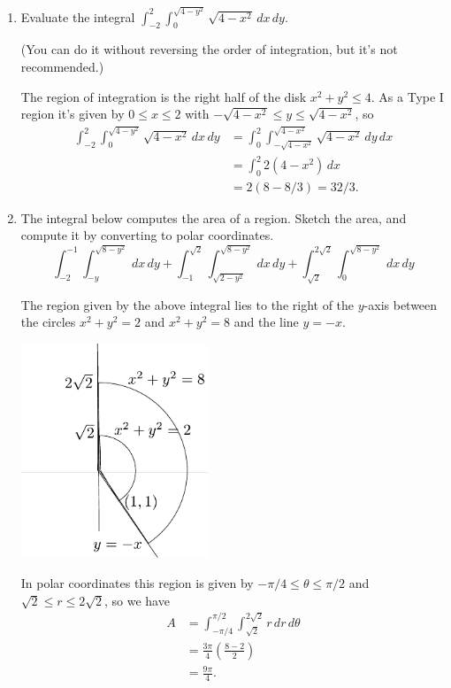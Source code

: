 \documentclass[12pt]{article}
\newcommand{\points}[1]{\marginpar{\hspace{24pt}[#1]}}
\newcommand{\di}{\displaystyle}
\begin{document}
\begin{enumerate}
\item Evaluate the integral $\di \int_{-2}^2\int_0^{\sqrt{4-y^2}}\sqrt{4-x^2}\,dx\,dy$. \points{6}

(You can do it without reversing the order of integration, but it's not recommended.)


\bigskip

The region of integration is the right half of the disk $x^2+y^2\leq 4$. As a Type I region it's given by $0\leq x\leq 2$ with $-\sqrt{4-x^2}\leq y\leq \sqrt{4-x^2}$, so
\begin{align*}
 \int_{-2}^2\int_0^{\sqrt{4-y^2}}\sqrt{4-x^2}\,dx\,dy & = \int_0^2\int_{-\sqrt{4-x^2}}^{\sqrt{4-x^2}}\sqrt{4-x^2}\,dy\,dx\\
& = \int_0^2 2(4-x^2)\,dx\\
& = 2(8-8/3) = 32/3.
\end{align*}

\bigskip


\item The integral below computes the area of a region. Sketch the area, and compute it by converting to polar coordinates. \points{6}
\[
\int_{-2}^{-1}\int_{-y}^{\sqrt{8-y^2}}\,dx\,dy+\int_{-1}^{\sqrt{2}}\int_{\sqrt{2-y^2}}^{\sqrt{8-y^2}}\,dx\,dy + \int_{\sqrt{2}}^{2\sqrt{2}}\int_0^{\sqrt{8-y^2}}\,dx\,dy
\]

\bigskip

The region given by the above integral lies to the right of the $y$-axis between the circles $x^2+y^2=2$ and $x^2+y^2=8$ and the line $y=- x$. 
\begin{multicols}{2}
 \begin{center}
  \includegraphics[width=2.2in]{T3_2b.pdf}
 \end{center}
\columnbreak
 
In polar coordinates this region is given by $-\pi/4\leq \theta\leq \pi/2$ and $\sqrt{2}\leq r\leq 2\sqrt{2}$, so we have
\begin{align*}
 A & = \int_{-\pi/4}^{\pi/2}\int_{\sqrt{2}}^{2\sqrt{2}}r\,dr\,d\theta\\
& = \frac{3\pi}{4}\left(\frac{8-2}{2}\right)\\
& = \frac{9\pi}{4}.
\end{align*}


\end{multicols}
\end{enumerate}
\end{document}
